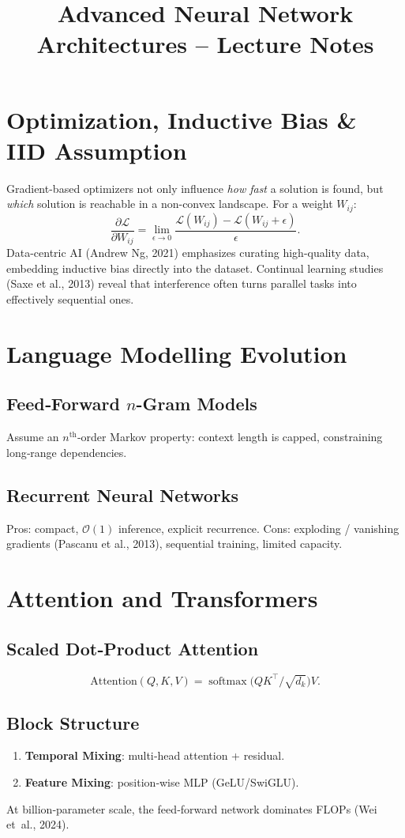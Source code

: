 \documentclass{article}
\title{Advanced Neural Network Architectures -- Lecture Notes}
\date{}
\begin{document}
\maketitle

\section{Optimization, Inductive Bias \& IID Assumption}
Gradient-based optimizers not only influence \emph{how fast} a solution is found, but \emph{which} solution is reachable in a non-convex landscape. 
For a weight $W_{ij}$:
\[
\frac{\partial \mathcal{L}}{\partial W_{ij}} = 
\lim_{\epsilon\to 0} \frac{\mathcal{L}(W_{ij}) - \mathcal{L}(W_{ij}+\epsilon)}{\epsilon}.
\]
Data-centric AI (Andrew Ng, 2021) emphasizes curating high-quality data, embedding inductive bias directly into the dataset. 
Continual learning studies (Saxe et al., 2013) reveal that interference often turns parallel tasks into effectively sequential ones.

\section{Language Modelling Evolution}
\subsection{Feed‑Forward \texorpdfstring{$n$}{n}-Gram Models}
Assume an $n^{\text{th}}$‑order Markov property: context length is capped, constraining long‑range dependencies.

\subsection{Recurrent Neural Networks}
Pros: compact, $\mathcal{O}(1)$ inference, explicit recurrence. %
Cons: exploding / vanishing gradients (Pascanu et al., 2013), sequential training, limited capacity.

\section{Attention and Transformers}
\subsection{Scaled Dot‑Product Attention}
\[
\text{Attention}(Q,K,V)=\operatorname{softmax}\!\bigl(QK^{\top}/\sqrt{d_k}\bigr)V.
\]

\subsection{Block Structure}
\begin{enumerate}
  \item \textbf{Temporal Mixing}: multi‑head attention + residual.
  \item \textbf{Feature Mixing}: position‑wise MLP (GeLU/SwiGLU).
\end{enumerate}
At billion‑parameter scale, the feed‑forward network dominates FLOPs (Wei et al., 2024).
\end{document}
